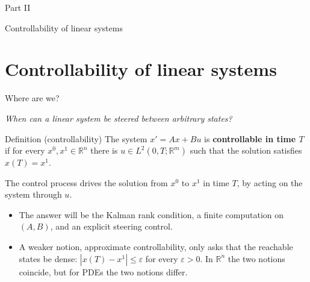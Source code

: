 \documentclass[10pt]{beamer}
\newcommand{\R}{\mathbb{R}}
\begin{document}
\begin{frame}[standout]
Part II

\medskip
\normalsize Controllability of linear systems
\end{frame}


\section{Controllability of linear systems}

\begin{frame}{Where are we?}
\footnotesize
\begin{center}
\emph{When can a linear system be steered between arbitrary states?}
\end{center}
\begin{mathbox}{Definition (controllability)}
The system $x'=Ax+Bu$ is \textbf{controllable in time $T$} if for every $x^0,x^1\in\R^n$ there is $u\in L^2(0,T;\R^m)$ such that the solution satisfies $x(T)=x^1$.
\end{mathbox}
The control process drives the solution from $x^0$ to $x^1$ in time $T$, by acting on the system through $u$.
\begin{itemize}
\item The answer will be the \alert{Kalman rank condition}, a finite computation on $(A,B)$, and an \alert{explicit} steering control.
\item A weaker notion, \alert{approximate controllability}, only asks that the reachable states be dense: $|x(T)-x^1|\le\varepsilon$ for every $\varepsilon>0$. In $\R^n$ the two notions coincide, but for PDEs the two notions differ.
\end{itemize}
\end{frame}
\end{document}

